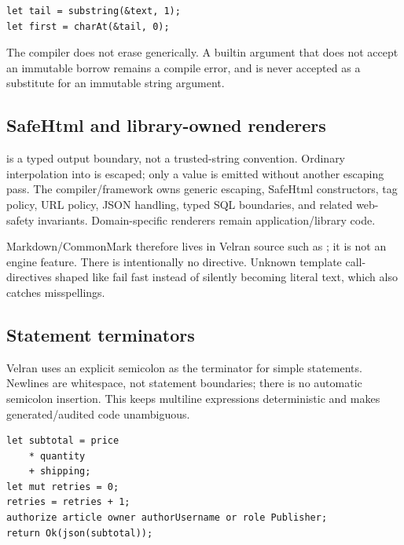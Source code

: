 \begin{lstlisting}[language=Velran]
let tail = substring(&text, 1);
let first = charAt(&tail, 0);
\end{lstlisting}

The compiler does not erase \code{\&} generically. A builtin argument that does not accept an immutable borrow remains a compile error, and  is never accepted as a substitute for an immutable string argument.

\subsection*{SafeHtml and library-owned renderers}

 is a typed output boundary, not a trusted-string convention. Ordinary  interpolation into  is escaped; only a  value is emitted without another escaping pass. The compiler/framework owns generic escaping, SafeHtml constructors, tag policy, URL policy, JSON handling, typed SQL boundaries, and related web-safety invariants. Domain-specific renderers remain application/library code.

Markdown/CommonMark therefore lives in Velran source such as ; it is not an engine feature. There is intentionally no  directive. Unknown template call-directives shaped like  fail fast instead of silently becoming literal text, which also catches misspellings.


\subsection*{Statement terminators}

Velran uses an explicit semicolon as the terminator for simple statements. Newlines are whitespace, not statement boundaries; there is no automatic semicolon insertion. This keeps multiline expressions deterministic and makes generated/audited code unambiguous.

\begin{lstlisting}[language=Velran]
let subtotal = price
    * quantity
    + shipping;
let mut retries = 0;
retries = retries + 1;
authorize article owner authorUsername or role Publisher;
return Ok(json(subtotal));
\end{lstlisting}

